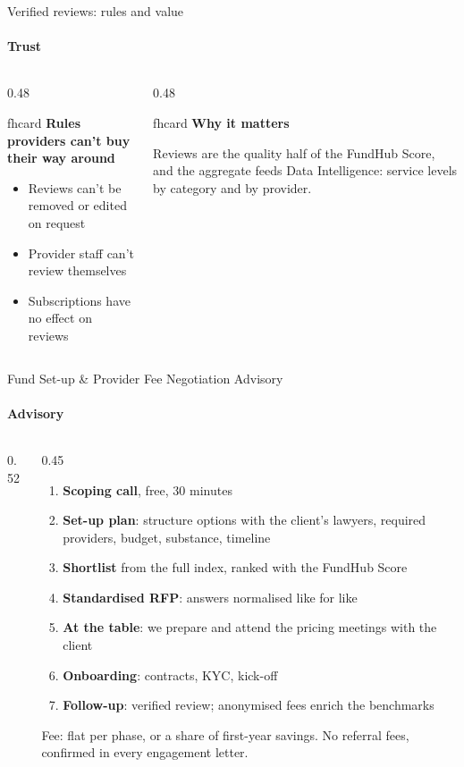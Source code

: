 \documentclass[aspectratio=169,10pt]{beamer}
\newcommand{\fhcard}[2]{%
  \begin{beamercolorbox}[wd=\linewidth,sep=7pt,rounded=true]{fhcard}
    {\small\bfseries\color{fhEmeraldDark}#1}\par\vspace{2pt}\footnotesize #2
  \end{beamercolorbox}}
\begin{document}
\begin{frame}{Verified reviews: rules and value}
  \framesubtitle{Trust}
  \begin{columns}[T]
    \begin{column}{0.48\textwidth}
      \fhcard{Rules providers can't buy their way around}{\begin{itemize}
        \item Reviews can't be removed or edited on request
        \item Provider staff can't review themselves
        \item Subscriptions have no effect on reviews
      \end{itemize}}
    \end{column}
    \begin{column}{0.48\textwidth}
      \fhcard{Why it matters}{Reviews are the quality half of the FundHub Score, and the aggregate feeds Data Intelligence: service levels by category and by provider.}
    \end{column}
  \end{columns}
\end{frame}

\begin{frame}{Fund Set-up \& Provider Fee Negotiation Advisory}
  \framesubtitle{Advisory}
  \begin{columns}[T]
    \begin{column}{0.52\textwidth}\end{column}
    \begin{column}{0.45\textwidth}
      \begin{enumerate}\scriptsize
        \item \textbf{Scoping call}, free, 30 minutes
        \item \textbf{Set-up plan}: structure options with the client's lawyers, required providers, budget, substance, timeline
        \item \textbf{Shortlist} from the full index, ranked with the FundHub Score
        \item \textbf{Standardised RFP}: answers normalised like for like
        \item \textbf{At the table}: we prepare and attend the pricing meetings with the client
        \item \textbf{Onboarding}: contracts, KYC, kick-off
        \item \textbf{Follow-up}: verified review; anonymised fees enrich the benchmarks
      \end{enumerate}
      {\scriptsize\color{fhInkSoft}Fee: flat per phase, or a share of first-year savings. No referral fees, confirmed in every engagement letter.}
    \end{column}
  \end{columns}
\end{frame}
\end{document}
